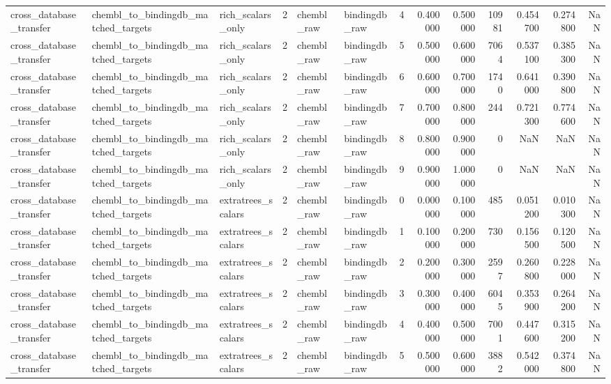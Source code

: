 \begin{longtable}{lllrllrrrrrrr}
cross\_database\_transfer & chembl\_to\_bindingdb\_matched\_targets & rich\_scalars\_only & 2 & chembl\_raw & bindingdb\_raw & 4 & 0.400000 & 0.500000 & 10981 & 0.454700 & 0.274800 & NaN \\
cross\_database\_transfer & chembl\_to\_bindingdb\_matched\_targets & rich\_scalars\_only & 2 & chembl\_raw & bindingdb\_raw & 5 & 0.500000 & 0.600000 & 7064 & 0.537100 & 0.385300 & NaN \\
cross\_database\_transfer & chembl\_to\_bindingdb\_matched\_targets & rich\_scalars\_only & 2 & chembl\_raw & bindingdb\_raw & 6 & 0.600000 & 0.700000 & 1740 & 0.641000 & 0.390800 & NaN \\
cross\_database\_transfer & chembl\_to\_bindingdb\_matched\_targets & rich\_scalars\_only & 2 & chembl\_raw & bindingdb\_raw & 7 & 0.700000 & 0.800000 & 244 & 0.721300 & 0.774600 & NaN \\
cross\_database\_transfer & chembl\_to\_bindingdb\_matched\_targets & rich\_scalars\_only & 2 & chembl\_raw & bindingdb\_raw & 8 & 0.800000 & 0.900000 & 0 & NaN & NaN & NaN \\
cross\_database\_transfer & chembl\_to\_bindingdb\_matched\_targets & rich\_scalars\_only & 2 & chembl\_raw & bindingdb\_raw & 9 & 0.900000 & 1.000000 & 0 & NaN & NaN & NaN \\
cross\_database\_transfer & chembl\_to\_bindingdb\_matched\_targets & extratrees\_scalars & 2 & chembl\_raw & bindingdb\_raw & 0 & 0.000000 & 0.100000 & 485 & 0.051200 & 0.010300 & NaN \\
cross\_database\_transfer & chembl\_to\_bindingdb\_matched\_targets & extratrees\_scalars & 2 & chembl\_raw & bindingdb\_raw & 1 & 0.100000 & 0.200000 & 730 & 0.156500 & 0.120500 & NaN \\
cross\_database\_transfer & chembl\_to\_bindingdb\_matched\_targets & extratrees\_scalars & 2 & chembl\_raw & bindingdb\_raw & 2 & 0.200000 & 0.300000 & 2597 & 0.260800 & 0.228000 & NaN \\
cross\_database\_transfer & chembl\_to\_bindingdb\_matched\_targets & extratrees\_scalars & 2 & chembl\_raw & bindingdb\_raw & 3 & 0.300000 & 0.400000 & 6045 & 0.353900 & 0.264200 & NaN \\
cross\_database\_transfer & chembl\_to\_bindingdb\_matched\_targets & extratrees\_scalars & 2 & chembl\_raw & bindingdb\_raw & 4 & 0.400000 & 0.500000 & 7001 & 0.447600 & 0.315200 & NaN \\
cross\_database\_transfer & chembl\_to\_bindingdb\_matched\_targets & extratrees\_scalars & 2 & chembl\_raw & bindingdb\_raw & 5 & 0.500000 & 0.600000 & 3882 & 0.542000 & 0.374800 & NaN \\

\end{longtable}
